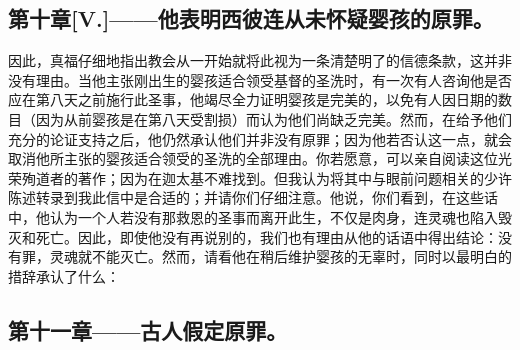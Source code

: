 \subsection{第十章[V.]——他表明西彼连从未怀疑婴孩的原罪。}

因此，真福仔细地指出教会从一开始就将此视为一条清楚明了的信德条款，这并非没有理由。当他主张刚出生的婴孩适合领受基督的圣洗时，有一次有人咨询他是否应在第八天之前施行此圣事，他竭尽全力证明婴孩是完美的，以免有人因日期的数目（因为从前婴孩是在第八天受割损）而认为他们尚缺乏完美。然而，在给予他们充分的论证支持之后，他仍然承认他们并非没有原罪；因为他若否认这一点，就会取消他所主张的婴孩适合领受的圣洗的全部理由。你若愿意，可以亲自阅读这位光荣殉道者的著作；因为在迦太基不难找到。但我认为将其中与眼前问题相关的少许陈述转录到我此信中是合适的；并请你们仔细注意。他说，你们看到，在这些话中，他认为一个人若没有那救恩的圣事而离开此生，不仅是肉身，连灵魂也陷入毁灭和死亡。因此，即使他没有再说别的，我们也有理由从他的话语中得出结论：没有罪，灵魂就不能灭亡。然而，请看他在稍后维护婴孩的无辜时，同时以最明白的措辞承认了什么：\par


\subsection{第十一章——古人假定原罪。}

